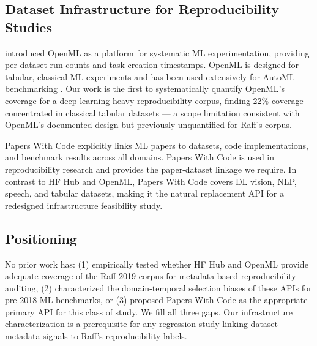 \subsection{Dataset Infrastructure for Reproducibility Studies}

\citet{Vanschoren2014OpenML} introduced OpenML as a platform for systematic ML experimentation, providing per-dataset run counts and task creation timestamps. OpenML is designed for tabular, classical ML experiments and has been used extensively for AutoML benchmarking \citep{Feurer2022Auto}. Our work is the first to systematically quantify OpenML's coverage for a deep-learning-heavy reproducibility corpus, finding 22\% coverage concentrated in classical tabular datasets --- a scope limitation consistent with OpenML's documented design but previously unquantified for Raff's corpus.

Papers With Code \citep{Stojnic2020Papers} explicitly links ML papers to datasets, code implementations, and benchmark results across all domains. Papers With Code is used in reproducibility research and provides the paper-dataset linkage we require. In contrast to HF Hub and OpenML, Papers With Code covers DL vision, NLP, speech, and tabular datasets, making it the natural replacement API for a redesigned infrastructure feasibility study.

\subsection{Positioning}

No prior work has: (1) empirically tested whether HF Hub and OpenML provide adequate coverage of the Raff 2019 corpus for metadata-based reproducibility auditing, (2) characterized the domain-temporal selection biases of these APIs for pre-2018 ML benchmarks, or (3) proposed Papers With Code as the appropriate primary API for this class of study. We fill all three gaps. Our infrastructure characterization is a prerequisite for any regression study linking dataset metadata signals to Raff's reproducibility labels.
